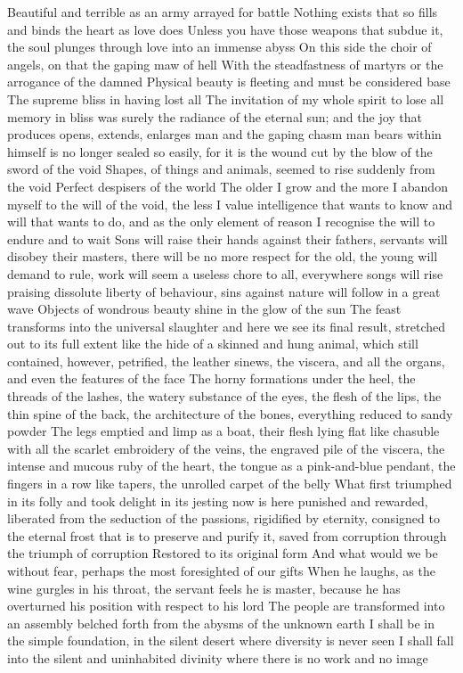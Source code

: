 \documentclass{article}
\begin{document}
Beautiful and terrible as an army arrayed for battle
Nothing exists that so fills and binds the heart as love does
Unless you have those weapons that subdue it, the soul plunges through love into an immense abyss
On this side the choir of angels, on that the gaping maw of hell
With the steadfastness of martyrs or the arrogance of the damned
Physical beauty is fleeting and must be considered base
The supreme bliss in having lost all
The invitation of my whole spirit to lose all memory in bliss was surely the radiance of the eternal sun; and the joy that produces opens, extends, enlarges man and the gaping chasm man bears within himself is no longer sealed so easily, for it is the wound cut by the blow of the sword of the void
Shapes, of things and animals, seemed to rise suddenly from the void
Perfect despisers of the world
The older I grow and the more I abandon myself to the will of the void, the less I value intelligence that wants to know and will that wants to do, and as the only element of reason I recognise the will to endure and to wait
Sons will raise their hands against their fathers, servants will disobey their masters, there will be no more respect for the old, the young will demand to rule, work will seem a useless chore to all, everywhere songs will rise praising dissolute liberty of behaviour, sins against nature will follow in a great wave
Objects of wondrous beauty shine in the glow of the sun
The feast transforms into the universal slaughter and here we see its final result, stretched out to its full extent like the hide of a skinned and hung animal, which still contained, however, petrified, the leather sinews, the viscera, and all the organs, and even the features of the face
The horny formations under the heel, the threads of the lashes, the watery substance of the eyes, the flesh of the lips, the thin spine of the back, the architecture of the bones, everything reduced to sandy powder
The legs emptied and limp as a boat, their flesh lying flat like chasuble with all the scarlet embroidery of the veins, the engraved pile of the viscera, the intense and mucous ruby of the heart, the tongue as a pink-and-blue pendant, the fingers in a row like tapers, the unrolled carpet of the belly
What first triumphed in its folly and took delight in its jesting now is here punished and rewarded, liberated from the seduction of the passions, rigidified by eternity, consigned to the eternal frost that is to preserve and purify it, saved from corruption through the triumph of corruption
Restored to its original form
And what would we be without fear, perhaps the most foresighted of our gifts
When he laughs, as the wine gurgles in his throat, the servant feels he is master, because he has overturned his position with respect to his lord
The people are transformed into an assembly belched forth from the abysms of the unknown earth
I shall be in the simple foundation, in the silent desert where diversity is never seen
I shall fall into the silent and uninhabited divinity where there is no work and no image
\fi
\end{document}
